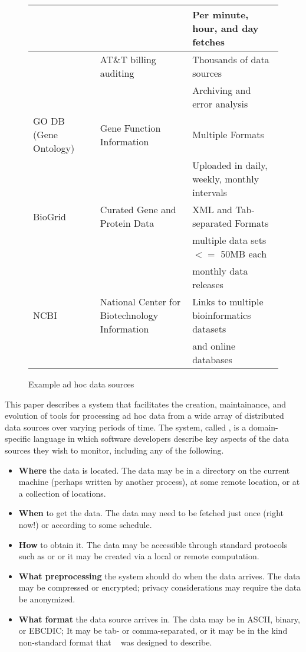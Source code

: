 \begin{figure*}
\begin{center}
\begin{tabular}{|l|l|l|}
                                           && Per minute, hour, and day fetches\\\hline
\ningaui{}       & AT\&T billing auditing   & Thousands of data sources\\
                 &                          & Archiving and error analysis\\\hline
GO DB (Gene Ontology)~\cite{geneontology} & Gene Function Information & Multiple Formats \\
                                             && Uploaded in daily, weekly, monthly intervals \\\hline
BioGrid~\cite{biogrid} & Curated Gene and Protein Data & XML and Tab-separated Formats \\
          & & multiple data sets $<=$ 50MB each \\
          & & monthly data releases \\\hline
NCBI~\cite{ncbi} & National Center for Biotechnology Information & Links to multiple bioinformatics datasets \\
                                                     && and online databases\\
\hline\hline
\end{tabular}
\end{center}
\caption{Example ad hoc data sources}
\label{fig:exampledata}
\end{figure*}

This paper describes a system that facilitates the creation,
maintainance, and evolution of tools for processing ad hoc data from a
wide array of distributed data sources over varying periods of
time. The system, called \padsd{}, is a domain-specific language in
which software developers describe key aspects of the data sources
they wish to monitor, including any of the following.

\begin{itemize}
\item {\bf Where} the data is located.  The data may be in a directory
on the current machine (perhaps written by another process), at some 
remote location, or at a collection of locations.
\item {\bf When} to get the data.  The data may need to be fetched just 
once (right now!) or according to some schedule.
\item {\bf How} to obtain it.  The data may be accessible through standard 
protocols such as  or  or it may be created via a
local or remote computation. 
\item {\bf What preprocessing} the system should do when the data arrives.  The 
data may be compressed or encrypted;  privacy considerations may require 
the data be anonymized.
\item {\bf What format} the data source arrives in.  The data may be
  in ASCII, binary, or EBCDIC; It may be tab- or comma-separated, or
  it may be in the kind non-standard format that
  \pads{}~\cite{fisher+:pads} was designed to describe.
\end{itemize}

